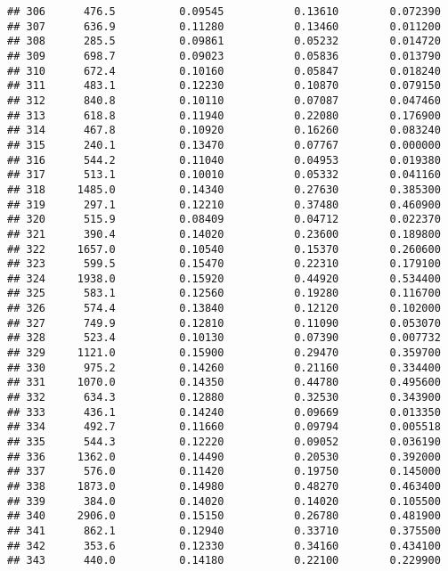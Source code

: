 \documentclass[
]{article}
\begin{document}
\begin{verbatim}
## 306      476.5          0.09545           0.13610        0.072390
## 307      636.9          0.11280           0.13460        0.011200
## 308      285.5          0.09861           0.05232        0.014720
## 309      698.7          0.09023           0.05836        0.013790
## 310      672.4          0.10160           0.05847        0.018240
## 311      483.1          0.12230           0.10870        0.079150
## 312      840.8          0.10110           0.07087        0.047460
## 313      618.8          0.11940           0.22080        0.176900
## 314      467.8          0.10920           0.16260        0.083240
## 315      240.1          0.13470           0.07767        0.000000
## 316      544.2          0.11040           0.04953        0.019380
## 317      513.1          0.10010           0.05332        0.041160
## 318     1485.0          0.14340           0.27630        0.385300
## 319      297.1          0.12210           0.37480        0.460900
## 320      515.9          0.08409           0.04712        0.022370
## 321      390.4          0.14020           0.23600        0.189800
## 322     1657.0          0.10540           0.15370        0.260600
## 323      599.5          0.15470           0.22310        0.179100
## 324     1938.0          0.15920           0.44920        0.534400
## 325      583.1          0.12560           0.19280        0.116700
## 326      574.4          0.13840           0.12120        0.102000
## 327      749.9          0.12810           0.11090        0.053070
## 328      523.4          0.10130           0.07390        0.007732
## 329     1121.0          0.15900           0.29470        0.359700
## 330      975.2          0.14260           0.21160        0.334400
## 331     1070.0          0.14350           0.44780        0.495600
## 332      634.3          0.12880           0.32530        0.343900
## 333      436.1          0.14240           0.09669        0.013350
## 334      492.7          0.11660           0.09794        0.005518
## 335      544.3          0.12220           0.09052        0.036190
## 336     1362.0          0.14490           0.20530        0.392000
## 337      576.0          0.11420           0.19750        0.145000
## 338     1873.0          0.14980           0.48270        0.463400
## 339      384.0          0.14020           0.14020        0.105500
## 340     2906.0          0.15150           0.26780        0.481900
## 341      862.1          0.12940           0.33710        0.375500
## 342      353.6          0.12330           0.34160        0.434100
## 343      440.0          0.14180           0.22100        0.229900

\end{verbatim}
\end{document}
